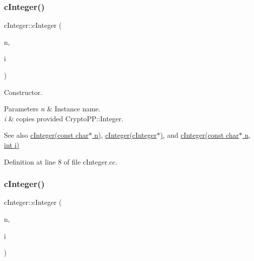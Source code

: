 \mbox{\label{classcInteger_a31669ca6b9b7f41f906320aaee8c8082}} 
\subsubsection{\texorpdfstring{c\+Integer()}{cInteger()}\hspace{0.1cm}{\footnotesize\ttfamily [2/4]}}
{\footnotesize\ttfamily c\+Integer\+::c\+Integer (\begin{DoxyParamCaption}\item[{const char $\ast$}]{n,  }\item[{Crypto\+P\+P\+::\+Integer $\ast$}]{i }\end{DoxyParamCaption})}



Constructor. 


\begin{DoxyParams}{Parameters}
{\em n} & Instance name. \\
\hline
{\em i} & copies provided Crypto\+P\+P\+::\+Integer. \\
\hline
\end{DoxyParams}
\begin{DoxySeeAlso}{See also}
\hyperlink{classcInteger_afc876143cbe434def0b5851a98bc3ae8}{c\+Integer(const char$\ast$ n)}, \hyperlink{classcInteger_ad47b8fb0711aefe0d10fa8903d8ed6ca}{c\+Integer(c\+Integer$\ast$)}, and \hyperlink{classcInteger_aca26b0880fd20e8a87dbb435f29af348}{c\+Integer(const char$\ast$ n, int i)} 
\end{DoxySeeAlso}


Definition at line 8 of file c\+Integer.\+cc.

\mbox{\label{classcInteger_aca26b0880fd20e8a87dbb435f29af348}} 
\subsubsection{\texorpdfstring{c\+Integer()}{cInteger()}\hspace{0.1cm}{\footnotesize\ttfamily [3/4]}}
{\footnotesize\ttfamily c\+Integer\+::c\+Integer (\begin{DoxyParamCaption}\item[{const char $\ast$}]{n,  }\item[{int}]{i }\end{DoxyParamCaption})}



